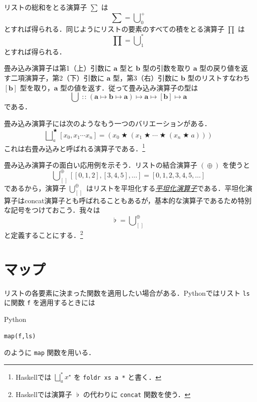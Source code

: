 \documentclass[a4paper]{jsbook}
\newcommand{\programminglanguage}[1]{\textsf{#1}}
\newcommand{\haskell}{\programminglanguage{Haskell}}
\newcommand{\python}{\programminglanguage{Python}}
\newcommand{\keyword}[1]{{\underline{\emph{#1}}}}
\newcommand{\code}[1]{\texttt{#1}}
\newenvironment{pythoncode}{\begin{itembox}[r]{\python}}{\end{itembox}}
\newcommand{\mType}[1]{\mathbf{#1}}
\newcommand{\mListType}[1]{[\mType{#1}]}
\newcommand{\mEmptyList}{{[\,]}}
\newcommand{\mListWith}[1]{\left[#1\right]}
\newcommand{\mList}[1]{{#1}^\mathrm{\star}}
\DeclareMathOperator{\mIn}{{:\!:}}
\DeclareMathOperator{\mMapsTo}{\mapsto}
\DeclareMathOperator{\mBinOp}{\bigstar}
\DeclareMathOperator*{\mFoldLeft}{\bigcup}
\DeclareMathOperator*{\mFoldRight}{\bigsqcup}
\DeclareMathOperator{\mConcat}{\flat}
\DeclareMathOperator{\mAppend}{\oplus}
\newcommand{\mProjection}[2]{#1\mMapsTo#2}
\begin{document}
リストの総和をとる演算子 $\sum$ は
\begin{equation}
\sum=\mFoldLeft^+_0
\end{equation}
とすれば得られる．同じようにリストの要素のすべての積をとる演算子 $\prod$ は
\begin{equation}
\prod=\mFoldLeft^*_1
\end{equation}
とすれば得られる．

畳み込み演算子は第1（上）引数に $\mType{a}$ 型と $\mType{b}$ 型の引数を取り $\mType{a}$ 型の戻り値を返す二項演算子，第2（下）引数に $\mType{a}$ 型，第3（右）引数に $\mType{b}$ 型のリストすなわち $\mListType{b}$ 型を取り，$\mType{a}$ 型の値を返す．従って畳み込み演算子の型は
\begin{equation}
\mFoldLeft
\mIn{}
\mProjection{
  \mProjection{
    \mProjection{
      (\mProjection{\mType{a}}{\mProjection{\mType{b}}{\mType{a}}})
    }
    {\mType{a}}
  }
  {
    \mListType{b}
  }
}
{
  \mType{a}
}
\end{equation}
である．

畳み込み演算子には次のようなもう一つのバリエーションがある．
\begin{equation}
\mFoldRight^{\mBinOp}_{a}\mListWith{x_0,x_1\dotsb x_n}
=(x_0\mBinOp(x_1\mBinOp\dotsb\mBinOp(x_n\mBinOp a)))
\end{equation}
これは右畳み込みと呼ばれる演算子である．\footnote{\haskell では $\mFoldRight^{*}_a\mList{x}$ を \code{foldr xs a *} と書く．}

畳み込み演算子の面白い応用例を示そう．リストの結合演算子 $(\mAppend)$ を使うと
\begin{equation}
\mFoldLeft_{\mEmptyList}^{\mAppend}\mListWith{\mListWith{0,1,2},\mListWith{3,4,5},\dots}=\mListWith{0,1,2,3,4,5,\dots}
\end{equation}
であるから，演算子 $\mFoldLeft_{\mEmptyList}^{\mAppend}$ はリストを平坦化する\keyword{平坦化演算子}である．平坦化演算子はconcat演算子とも呼ばれることもあるが，基本的な演算子であるため特別な記号をつけておこう．我々は
\begin{equation}
\mConcat=\mFoldLeft_{\mEmptyList}^{\mAppend}
\end{equation}
と定義することにする．\footnote{\haskell では演算子 $\mConcat$ の代わりに \code{concat} 関数を使う．}

\section{マップ}

リストの各要素に決まった関数を適用したい場合がある．\python ではリスト \code{ls} に関数 \code{f} を適用するときには
\begin{pythoncode}
\begin{verbatim}
map(f,ls)
\end{verbatim}
\end{pythoncode}
のように \code{map} 関数を用いる．
\end{document}
